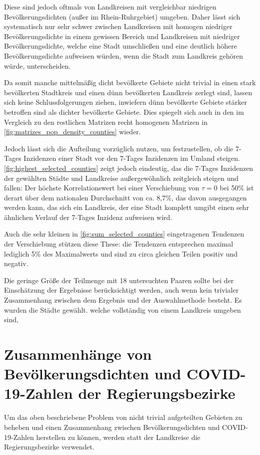 Diese sind jedoch oftmals von Landkreisen mit vergleichbar niedrigen Bevölkerungsdichten (außer im Rhein-Ruhrgebiet) umgeben. Daher lässt sich systematisch nur sehr schwer zwischen Landkreisen mit homogen niedriger Bevölkerungsdichte in einem gewissen Bereich und Landkreisen mit niedriger Bevölkerungsdichte, welche eine Stadt umschließen und eine deutlich höhere Bevölkerungsdichte aufweisen würden, wenn die Stadt zum Landkreis gehören würde, unterscheiden.

Da somit manche mittelmäßig dicht bevölkerte Gebiete nicht trivial in einen stark bevölkerten Stadtkreis und einen dünn bevölkerten Landkreis zerlegt sind, lassen sich keine Schlussfolgerungen ziehen, inwiefern dünn bevölkerte Gebiete stärker betroffen sind als dichter bevölkerte Gebiete. Dies spiegelt sich auch in den im Vergleich zu den restlichen Matrizen recht homogenen Matrizen in \autoref{fig:matrizes_pop_density_counties} wieder.

Jedoch lässt sich die Aufteilung vorzüglich nutzen, um festzustellen, ob die 7-Tages Inzidenzen einer Stadt vor den 7-Tages Inzidenzen im Umland steigen.
\autoref{fig:highest_selected_counties} zeigt jedoch eindeutig, das die 7-Tages Inzidenzen der gewählten Städte und Landkreise außergewöhnlich zeitgleich steigen und fallen: Der höchste Korrelationswert bei einer Verschiebung von $\tau=0$ bei 50\% ist derart über dem nationalen Durchschnitt von ca. 8,7\%, das davon ausgegangen werden kann, das sich ein Landkreis, der eine Stadt komplett umgibt einen sehr ähnlichen Verlauf der 7-Tages Inzidenz aufweisen wird.

Auch die sehr kleinen in \autoref{fig:sum_selected_counties} eingetragenen Tendenzen der Verschiebung stützen diese These: die Tendenzen entsprechen maximal lediglich 5\% des Maximalwerts und sind zu circa gleichen Teilen positiv und negativ.

Die geringe Größe der Teilmenge mit 18 untersuchten Paaren sollte bei der Einschätzung der Ergebnisse berücksichtigt werden, auch wenn kein trivialer Zusammenhang zwischen dem Ergebnis und der Auswahlmethode besteht. Es wurden die Städte gewählt. welche vollständig von einem Landkreis umgeben sind,

\section{Zusammenhänge von Bevölkerungsdichten und COVID-19-Zahlen der Regierungsbezirke}\label{sec:discussion:pop_density_districts}
Um das oben beschriebene Problem von nicht trivial aufgeteilten Gebieten zu beheben und einen Zusammenhang zwischen Bevölkerungsdichten und COVID-19-Zahlen herstellen zu können, werden statt der Landkreise die Regierungsbezirke verwendet.

